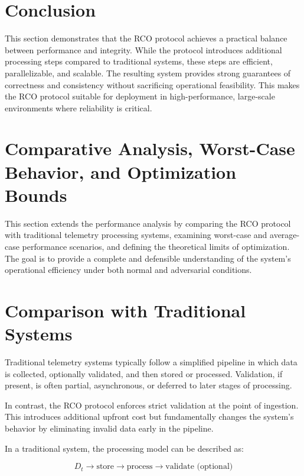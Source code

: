 \section{Conclusion}

This section demonstrates that the RCO protocol achieves a practical balance between performance and integrity. While the protocol introduces additional processing steps compared to traditional systems, these steps are efficient, parallelizable, and scalable. The resulting system provides strong guarantees of correctness and consistency without sacrificing operational feasibility. This makes the RCO protocol suitable for deployment in high-performance, large-scale environments where reliability is critical.

\section{Comparative Analysis, Worst-Case Behavior, and Optimization Bounds}

This section extends the performance analysis by comparing the RCO protocol with traditional telemetry processing systems, examining worst-case and average-case performance scenarios, and defining the theoretical limits of optimization. The goal is to provide a complete and defensible understanding of the system’s operational efficiency under both normal and adversarial conditions.

\section{Comparison with Traditional Systems}

Traditional telemetry systems typically follow a simplified pipeline in which data is collected, optionally validated, and then stored or processed. Validation, if present, is often partial, asynchronous, or deferred to later stages of processing.

In contrast, the RCO protocol enforces strict validation at the point of ingestion. This introduces additional upfront cost but fundamentally changes the system’s behavior by eliminating invalid data early in the pipeline.

In a traditional system, the processing model can be described as:

\begin{equation}
D_t \rightarrow \text{store} \rightarrow \text{process} \rightarrow \text{validate (optional)}
\end{equation}

